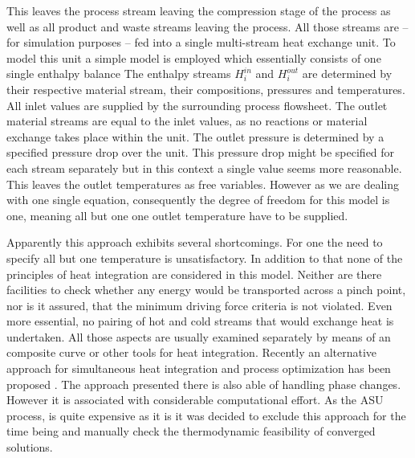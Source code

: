     This leaves the process stream leaving the compression stage of the process as well as all product and waste streams
    leaving the process. All those streams are -- for simulation purposes -- fed into a single multi-stream heat exchange
    unit. To model this unit a simple model is employed which essentially consists of one single enthalpy balance
    The enthalpy streams $H_i^{in}$ and $H_i^{out}$ are determined by their respective material stream, their compositions,
    pressures and temperatures. All inlet values are supplied by the surrounding process flowsheet. The outlet material streams
    are equal to the inlet values, as no reactions or material exchange takes place within the unit. The outlet pressure
    is determined by a specified pressure drop over the unit. This pressure drop might be specified for each stream separately
    but in this context a single value seems more reasonable. This leaves the outlet temperatures as free variables. However
    as we are dealing with one single equation, consequently the degree of freedom for this model is one, meaning all but one
    one outlet temperature have to be supplied.

    Apparently this approach exhibits several shortcomings. For one the need to specify all but one temperature is
    unsatisfactory. In addition to that none of the principles of heat integration are considered in this model.
    Neither are there facilities to check whether any energy would be transported across a pinch point, nor is
    it assured, that the minimum driving force criteria is not violated. Even more essential, no pairing of
    hot and cold streams that would exchange heat is undertaken. All those aspects are usually examined separately
    by means of an composite curve or other tools for heat integration. Recently an alternative approach for
    simultaneous heat integration and process optimization has been proposed \cite{Kamath.2012}. The approach
    presented there is also able of handling phase changes. However it is associated with considerable computational
    effort. As the ASU process, is quite expensive as it is it was decided to exclude this approach for the time being
    and manually check the thermodynamic feasibility of converged solutions.



